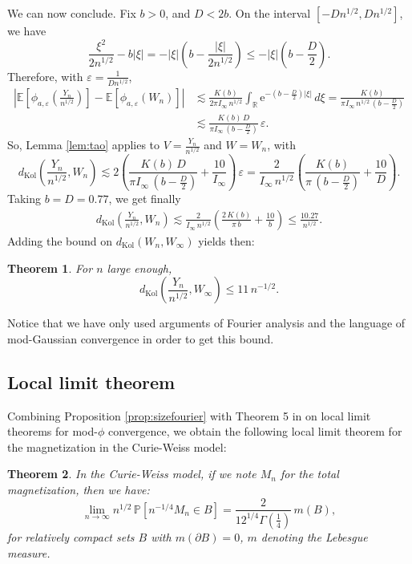 \documentclass[12pt,a4paper,reqno]{amsart}
\newcommand{\R}{\mathbb{R}}
\newcommand{\E}{\mathrm{e}}
\newcommand{\esper}{\mathbb{E}}
\newcommand{\proba}{\mathbb{P}}
\newcommand{\eps}{\varepsilon}
\newtheorem{theorem}{Theorem}
\theoremstyle{remark}
\begin{document}
We can now conclude. Fix $b>0$, and $D<2b$. On the interval $[-Dn^{1/2},Dn^{1/2}]$,  we have
$$\frac{\xi^2}{2n^{1/2}}-b|\xi| = -|\xi|\left(b-\frac{|\xi|}{2n^{1/2}}\right) \leq - |\xi|\left(b-\frac{D}{2}\right).$$
Therefore, with $\eps=\frac{1}{Dn^{1/2}}$,
\begin{align*}\left| \esper\!\left[\phi_{a,\eps}\!\left(\frac{Y_n}{n^{1/2}}\right)\right]-\esper[\phi_{a,\eps}(W_n)]\right| &\lesssim \frac{K(b)}{2\pi I_\infty\,n^{1/2}} \int_{\R} \E^{-\left(b-\frac{D}{2}\right)|\xi|}\,d\xi= \frac{K(b)}{\pi I_\infty\,n^{1/2}\,\left(b-\frac{D}{2}\right)}\\
&\lesssim \frac{K(b)\, D}{\pi I_\infty \,\left(b-\frac{D}{2}\right)}\,\eps.
\end{align*}
So, Lemma \ref{lem:tao} applies to $V=\frac{Y_n}{n^{1/2}}$ and $W=W_n$, with
$$d_{\mathrm{Kol}}\left(\frac{Y_n}{n^{1/2}},W_n\right)\lesssim 2\left(\frac{K(b)\,D}{\pi I_\infty \,\left(b-\frac{D}{2}\right)}+\frac{10}{I_\infty}\right)\,\eps=\frac{2}{I_\infty\,n^{1/2}}\left(\frac{K(b)}{\pi\,(b-\frac{D}{2})}+\frac{10}{D}\right).$$
Taking $b=D=0.77$, we get finally
\begin{align*}
d_{\mathrm{Kol}}\left(\frac{Y_n}{n^{1/2}},W_n\right)\lesssim \frac{2}{I_\infty\,n^{1/2}} \left( \frac{2\,K(b)}{\pi \,b}+\frac{10}{b}\right)\leq \frac{10.27}{n^{1/2}}.
\end{align*}
Adding the bound on $d_{\mathrm{Kol}}(W_n,W_\infty)$ yields then:

\begin{theorem}
For $n$ large enough, $$d_{\mathrm{Kol}}\left(\frac{Y_n}{n^{1/2}},W_\infty\right)\leq 11\,n^{-1/2}.$$
\end{theorem}
Notice that we have only used arguments of Fourier analysis and the language of mod-Gaussian convergence in order to get this bound.
\medskip

 

\subsection{Local limit theorem}
Combining Proposition \ref{prop:sizefourier} with Theorem 5 in \cite{DKN11} on local limit theorems for mod-$\phi$ convergence, we obtain the following local limit theorem for the magnetization in the Curie-Weiss model:

\begin{theorem}
In the Curie-Weiss model, if we note $M_n$ for the total magnetization, then we have:
$$\lim_{n\to\infty} n^{1/2}\, \proba[n^{-1/4} M_n\in B]=\frac{2}{12^{1/4} \Gamma(\frac{1}{4})}\, m(B),$$
for relatively compact sets $B$ with $m(\partial B)=0$, $m$ denoting the Lebesgue measure.
\end{theorem}
\end{document}
